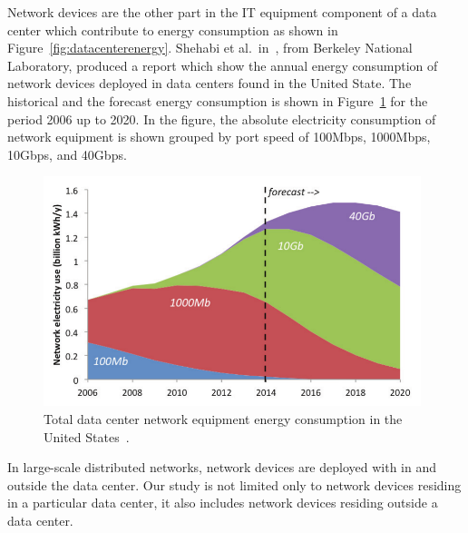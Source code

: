 Network devices are the other part in the IT equipment component of a data center which contribute to energy consumption as shown in Figure~\ref{fig:datacenterenergy}. Shehabi et al.~in~\cite{shehabi2016united}, from Berkeley National Laboratory, produced a report which show the annual energy consumption of network devices deployed in data centers found in the United State. The historical and the forecast energy consumption is shown in Figure~\ref{fig:usnetworkenergy} for the period 2006 up to 2020. In the figure, the absolute electricity consumption of network equipment is shown grouped by port speed of 100Mbps, 1000Mbps, 10Gbps, and 40Gbps. 
\begin{figure}[ht]
	\begin{center}
		\includegraphics[width=11cm]{images/usnetworkenergy.pdf}
		\caption{Total data center network equipment energy consumption in the United States~\cite{shehabi2016united}.}
		\label{fig:usnetworkenergy}
	\end{center}
\end{figure}

In large-scale distributed networks, network devices are deployed with in and outside the data center. Our study is not limited only to network devices residing in a particular data center, it also includes network devices residing outside a data center. 

